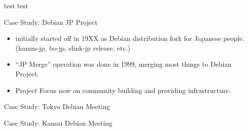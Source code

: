\documentclass[cjk,dvipdfmx,12pt]{beamer}
\title{$BBfOQ(B Debian Meeting}
\subtitle{$B;qNA(B}
\author{$B>e@n(B $B=c0l(B Junichi Uekawa\\dancer@debian.org\\IRC nick: dancerj}
\date{10 May 2008}
\begin{document}
\frame{\titlepage{}}

\begin{frame}{test}
 test
\end{frame}

\begin{frame}{Case Study: Debian JP Project}
\begin{itemize}
 \item initially started off in 19XX as Debian distribution fork for Japanese
       people. (hamm-jp, bo-jp, slink-jp release, etc.)
 \item ``JP Merge'' operation was done in 1999, merging most things to
       Debian Project.
 \item Project Focus now on community building and providing infrastructure.
\end{itemize}
\end{frame}

\begin{frame}{Case Study: Tokyo Debian Meeting}
\end{frame}

\begin{frame}{Case Study: Kansai Debian Meeting}
\end{frame}
\end{document}
